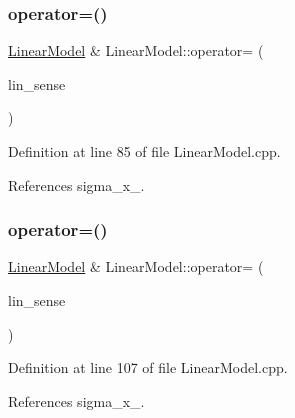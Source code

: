 \subsubsection{\texorpdfstring{operator=()}{operator=()}\hspace{0.1cm}{\footnotesize\ttfamily [1/2]}}
{\footnotesize\ttfamily \mbox{\hyperlink{classbfl_1_1LinearModel}{Linear\+Model}} \& Linear\+Model\+::operator= (\begin{DoxyParamCaption}\item[{const \mbox{\hyperlink{classbfl_1_1LinearModel}{Linear\+Model}} \&}]{lin\+\_\+sense }\end{DoxyParamCaption})\hspace{0.3cm}{\ttfamily [noexcept]}}



Definition at line 85 of file Linear\+Model.\+cpp.



References sigma\+\_\+x\+\_\+.

\mbox{\label{classbfl_1_1LinearModel_ab918eedc96632e51939fc9aad126215c}} 
\subsubsection{\texorpdfstring{operator=()}{operator=()}\hspace{0.1cm}{\footnotesize\ttfamily [2/2]}}
{\footnotesize\ttfamily \mbox{\hyperlink{classbfl_1_1LinearModel}{Linear\+Model}} \& Linear\+Model\+::operator= (\begin{DoxyParamCaption}\item[{\mbox{\hyperlink{classbfl_1_1LinearModel}{Linear\+Model}} \&\&}]{lin\+\_\+sense }\end{DoxyParamCaption})\hspace{0.3cm}{\ttfamily [noexcept]}}



Definition at line 107 of file Linear\+Model.\+cpp.



References sigma\+\_\+x\+\_\+.

\mbox{\label{classbfl_1_1LinearMeasurementModel_a8831b8acb4790db4c69db73200375c69}} 
